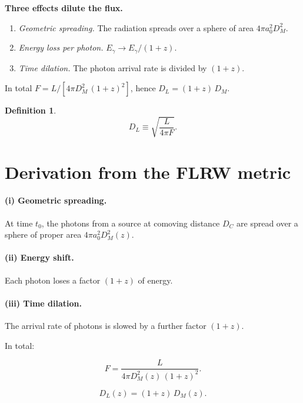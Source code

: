 \documentclass[11pt,a4paper,openany]{report}
\newcommand{\eqdef}{\equiv}
\newtheorem{definition}[theorem]{Definition}
\begin{document}
\begin{tcolorbox}[undergrad]
\textbf{Three effects dilute the flux.}
\begin{enumerate}[topsep=2pt]
\item \emph{Geometric spreading.} The radiation spreads over a sphere of area
  $4\pi a_{0}^{2} D_{M}^{2}$.
\item \emph{Energy loss per photon.} $E_{\gamma} \to E_{\gamma}/(1+z)$.
\item \emph{Time dilation.} The photon arrival rate is divided by $(1+z)$.
\end{enumerate}
In total $F = L/[4\pi D_{M}^{2}\,(1+z)^{2}]$, hence $D_{L} = (1+z)\,D_{M}$.
\end{tcolorbox}

\begin{definition}
\begin{equation}
D_{L} \eqdef \sqrt{\frac{L}{4\pi F}}.
\label{eq:DL_def}
\end{equation}
\end{definition}

\section{Derivation from the FLRW metric}

\paragraph{(i) Geometric spreading.} At time $t_0$, the photons from a source
at comoving distance $D_{C}$ are spread over a sphere of proper area
$4\pi a_{0}^{2} D_{M}^{2}(z)$.

\paragraph{(ii) Energy shift.} Each photon loses a factor $(1+z)$ of energy.

\paragraph{(iii) Time dilation.} The arrival rate of photons is slowed by a
further factor $(1+z)$.

\noindent In total:

\begin{equation}
F = \frac{L}{4\pi D_{M}^{2}(z)\,(1+z)^{2}}.
\label{eq:F_obs}
\end{equation}

\begin{equation}
\boxed{\;D_{L}(z) = (1+z)\,D_{M}(z).\;}
\label{eq:DL}
\end{equation}
\end{document}
